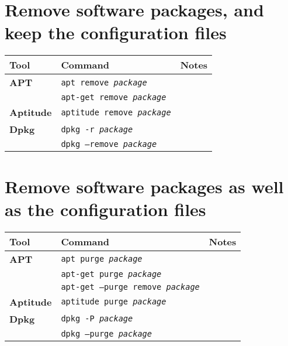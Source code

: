\documentclass[10pt]{article}
\begin{document}
\section{Remove software packages, and keep the configuration files}
\begin{tabular}{ p{3.5cm} p{9cm} p{11cm}}
  \hline
  \rowcolor{Gray}
  \textbf{Tool} & \textbf{Command} & \textbf{Notes} \\
  \hline 
  \textbf{APT} & \texttt{apt remove \textit{package}} & \\
  \rowcolor{Gray}
  & \texttt{apt-get remove \textit{package}} & \\
  \textbf{Aptitude} & \texttt{aptitude remove \textit{package}} & \\
  \rowcolor{Gray}
  \textbf{Dpkg} & \texttt{dpkg -r \textit{package}} & \\
  & \texttt{dpkg --remove \textit{package}} & \\
  \hline
\end{tabular}

\newpage

\cheatsheet

\section{Remove software packages as well as the configuration files}
\begin{tabular}{ p{3.5cm} p{9cm} p{11cm}}
  \hline
  \rowcolor{Gray}
  \textbf{Tool} & \textbf{Command} & \textbf{Notes} \\
  \hline 
  \textbf{APT}& \texttt{apt purge \textit{package}} & \\
  \rowcolor{Gray}
  & \texttt{apt-get purge \textit{package}} & \\
  & \texttt{apt-get --purge remove \textit{package}} & \\
  \rowcolor{Gray}
  \textbf{Aptitude} & \texttt{aptitude purge \textit{package}} & \\
  \textbf{Dpkg} & \texttt{dpkg -P \textit{package}} & \\
  \rowcolor{Gray}
  & \texttt{dpkg --purge \textit{package}} & \\
  \hline
\end{tabular}
\end{document}
